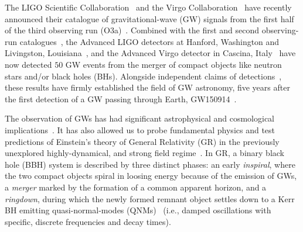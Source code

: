 


The LIGO Scientific Collaboration~\cite{lsc} and the Virgo
Collaboration~\cite{Virgo} have recently announced their catalogue of
gravitational-wave (GW) signals from the first
half of the third observing run (O3a)~\cite{Abbott:2020niy}. Combined
with the first and second observing-run catalogues~\cite{LIGOScientific:2018mvr}, the Advanced LIGO detectors at Hanford,
Washington and Livingston, Louisiana~\cite{Aasi:2014mqd},
and the Advanced Virgo detector in Cascina,
Italy~\cite{TheVirgo:2014hva} have now detected $50$ GW
events from the merger of compact objects like neutron stars and/or
black holes (BHs). Alongside independent claims of
detections~\cite{Nitz:2018imz,Nitz:2019hdf,Venumadhav:2019lyq,Zackay:2019btq}, these results have firmly established the field of GW astronomy, five years after the first detection of a GW passing through Earth, GW150914~\cite{Abbott:2016blz}.

The observation of GWs has had significant astrophysical and cosmological
implications~\cite{TheLIGOScientific:2016htt,GBM:2017lvd,Monitor:2017mdv,Abbott:2017xzu}. It
has also allowed us to probe fundamental
physics and test predictions of Einstein's theory of General Relativity
(GR) in the previously unexplored highly-dynamical, and strong field
regime~\cite{TheLIGOScientific:2016src,Abbott:2018lct,LIGOScientific:2019fpa}. In GR, a binary black hole (BBH) system is described by
three distinct phases: an early \textit{inspiral}, where the two
compact objects spiral in loosing energy because of the emission of GWs, a \textit{merger} marked by the
formation of a common apparent horizon, and a \textit{ringdown}, during which the newly formed remnant object settles down to a Kerr BH emitting quasi-normal-modes (QNMs)~\cite{Vishveshwara:1970zz,Vishveshwara:1970cc,Teukolsky:1973ha,Press:1973zz,Chandrasekhar:1975zza,Detweiler:1980gk,Kokkotas:1999bd,Berti:2009kk} (i.e., damped oscillations with specific, discrete frequencies and decay times).

